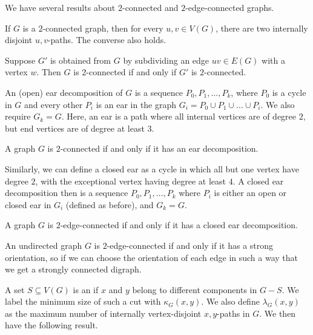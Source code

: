 We have several results about $2$-connected and $2$-edge-connected graphs.

\begin{theorem}[Whitney]
  If $G$ is a $2$-connected graph, then for every $u, v \in V(G)$, there are two
  internally disjoint $u,v$-paths.
  The converse also holds.
\end{theorem}

\begin{proposition}
  Suppose $G'$ is obtained from $G$ by subdividing an edge $uv \in E(G)$ with a
  vertex $w$.
  Then $G$ is $2$-connected if and only if $G'$ is $2$-connected.
\end{proposition}

An (open) ear decomposition of $G$ is a sequence $P_0, P_1, \ldots, P_k$, where
$P_0$ is a cycle in $G$ and every other $P_i$ is an ear in the graph $G_i = P_0
\cup P_1 \cup \ldots \cup P_i$.
We also require $G_k = G$.
Here, an ear is a path where all internal vertices are of degree $2$, but end
vertices are of degree at least $3$.

\begin{theorem}
  A graph $G$ is $2$-connected if and only if it has an ear decomposition.
\end{theorem}

Similarly, we can define a closed ear as a cycle in which all but one vertex
have degree $2$, with the exceptional vertex having degree at least $4$.
A closed ear decomposition then is a sequence $P_0, P_1, \ldots, P_k$ where
$P_i$ is either an open or closed ear in $G_i$ (defined as before), and $G_k =
G$.

\begin{theorem}
  A graph $G$ is $2$-edge-connected if and only if it has a closed ear
  decomposition.
\end{theorem}

\begin{theorem}[Robbins]
  An undirected graph $G$ is $2$-edge-connected if and only if it has a strong
  orientation, so if we can choose the orientation of each edge in such a way
  that we get a strongly connected digraph.
\end{theorem}

A set $S \subseteq V(G)$ is an  if $x$ and $y$ belong to
different components in $G - S$.
We label the minimum size of such a cut with $\kappa_G(x,y)$.
We also define $\lambda_G(x,y)$ as the maximum number of internally
vertex-disjoint $x,y$-paths in $G$.
We then have the following result.

